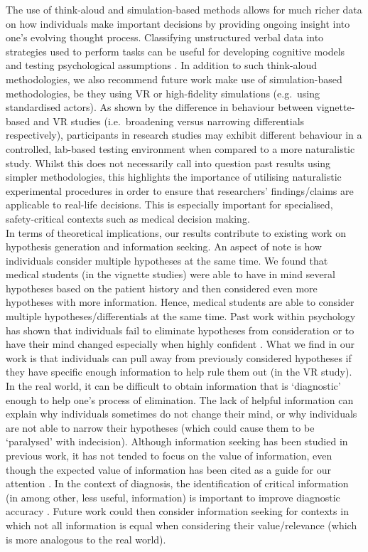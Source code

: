 \documentclass[a4paper, nobind]{templates/ociamthesis}
\begin{document}
The use of think-aloud and simulation-based methods allows for much richer data on how individuals make important decisions by providing ongoing insight into one's evolving thought process. Classifying unstructured verbal data into strategies used to perform tasks can be useful for developing cognitive models and testing psychological assumptions \autocite{ostrovsky_verbal_2024}. In addition to such think-aloud methodologies, we also recommend future work make use of simulation-based methodologies, be they using VR or high-fidelity simulations (e.g.~using standardised actors). As shown by the difference in behaviour between vignette-based and VR studies (i.e.~broadening versus narrowing differentials respectively), participants in research studies may exhibit different behaviour in a controlled, lab-based testing environment when compared to a more naturalistic study. Whilst this does not necessarily call into question past results using simpler methodologies, this highlights the importance of utilising naturalistic experimental procedures in order to ensure that researchers' findings/claims are applicable to real-life decisions. This is especially important for specialised, safety-critical contexts such as medical decision making.\\

In terms of theoretical implications, our results contribute to existing work on hypothesis generation and information seeking. An aspect of note is how individuals consider multiple hypotheses at the same time. We found that medical students (in the vignette studies) were able to have in mind several hypotheses based on the patient history and then considered even more hypotheses with more information. Hence, medical students are able to consider multiple hypotheses/differentials at the same time. Past work within psychology has shown that individuals fail to eliminate hypotheses from consideration \autocite{wason_failure_1960} or to have their mind changed \autocite{akaishi_autonomous_2014} especially when highly confident \autocite{rollwage_confidence_2020,pescetelli_confidence_2021}. What we find in our work is that individuals can pull away from previously considered hypotheses if they have specific enough information to help rule them out (in the VR study). In the real world, it can be difficult to obtain information that is `diagnostic' enough to help one's process of elimination. The lack of helpful information can explain why individuals sometimes do not change their mind, or why individuals are not able to narrow their hypotheses (which could cause them to be `paralysed' with indecision). Although information seeking has been studied in previous work, it has not tended to focus on the value of information, even though the expected value of information has been cited as a guide for our attention \autocite{manohar_attention_2013}. In the context of diagnosis, the identification of critical information (in among other, less useful, information) is important to improve diagnostic accuracy \autocite{kostopoulou_predictors_2008}. Future work could then consider information seeking for contexts in which not all information is equal when considering their value/relevance (which is more analogous to the real world).\\
\end{document}
